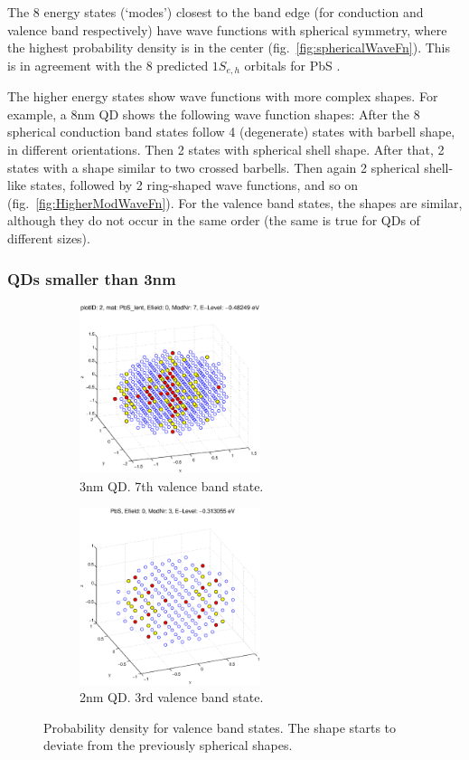 The 8 energy states (`modes') closest to the band edge (for conduction and valence band respectively) have wave functions with spherical symmetry, where the highest probability density is in the center (fig.~\ref{fig:sphericalWaveFn}). This is in agreement with the 8 predicted $1S_{e,h}$ orbitals for PbS \cite[p.410]{Talapin}.
	
The higher energy states show wave functions with more complex shapes. For example, a 8nm QD shows the following wave function shapes: After the 8 spherical conduction band states follow 4 (degenerate) states with barbell shape, in different orientations. Then 2 states with spherical shell shape. After that, 2 states with a shape similar to two crossed barbells. Then again 2 spherical shell-like states, followed by 2 ring-shaped wave functions, and so on (fig.~\ref{fig:HigherModWaveFn}). For the valence band states, the shapes are similar, although they do not occur in the same order (the same is true for QDs of different sizes).

\subsubsection{QDs smaller than 3nm}	

\begin{figure}[htbp]
	\centering
	\begin{subfigure}{200px}
		\includegraphics[width=200px]{Fig/Plots/r15VBmod7}
		\caption{3nm QD. 7th valence band state.}
	\end{subfigure}
	\begin{subfigure}{200px}
		\includegraphics[width=200px]{Fig/Plots/r1VBmod3}
		\caption{2nm QD. 3rd valence band state.}
	\end{subfigure}
	\caption{Probability density for valence band states. The shape starts to deviate from the previously spherical shapes.}
	\label{fig:asymWaveFn}
\end{figure}


